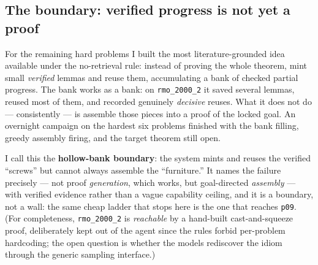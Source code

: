\subsection{The boundary: verified progress is not yet a proof}
For the remaining hard problems I built the most literature-grounded idea
available under the no-retrieval rule: instead of proving the whole theorem, mint
small \emph{verified} lemmas and reuse them, accumulating a bank of checked
partial progress. The bank works as a bank: on \texttt{rmo\_2000\_2} it saved
several lemmas, reused most of them, and recorded genuinely \emph{decisive}
reuses. What it does not do --- consistently --- is assemble those pieces into a
proof of the locked goal. An overnight campaign on the hardest six problems
finished with the bank filling, greedy assembly firing, and the target theorem
still open.

I call this the \textbf{hollow-bank boundary}: the system mints and reuses the
verified ``screws'' but cannot always assemble the ``furniture.'' It names the
failure precisely --- not proof \emph{generation}, which works, but goal-directed
\emph{assembly} --- with verified evidence rather than a vague capability ceiling,
and it is a boundary, not a wall: the same cheap ladder that stops here is the one
that reaches \texttt{p09}. (For completeness, \texttt{rmo\_2000\_2} is
\emph{reachable} by a hand-built cast-and-squeeze proof, deliberately kept out of
the agent since the rules forbid per-problem hardcoding; the open question is
whether the models rediscover the idiom through the generic sampling interface.)
